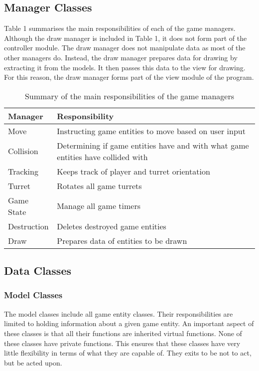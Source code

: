 \documentclass[10pt,twocolumn]{witseiepaper}
\begin{document}
\subsection{Manager Classes}
Table 1 summarises the main responsibilities of each of the game managers. Although the draw manager is included in Table 1, it does not form part of the controller module. The draw manager does not manipulate data as most of the other managers do. Instead, the draw manager prepares data for drawing by extracting it from the models. It then passes this data to the view for drawing. For this reason, the draw manager forms part of the view module of the program. 

\begin{table}[h]
	\centering
	\caption{Summary of the main responsibilities of the game managers}
	\begin{tabular}{|>{\centering\arraybackslash}m{2cm}|>{\centering\arraybackslash}m{4.5cm}|}
		\hline 
		\textbf{Manager} & \textbf{Responsibility} \\ 
		\hline 
		Move & Instructing game entities to move based on user input \\ 
		\hline 
		Collision & Determining if game entities have and with what game 								entities have collided with \\ 
		\hline 
		Tracking & Keeps track of player and turret orientation \\ 
		\hline 
		Turret & Rotates all game turrets \\ 
		\hline 
		Game State & Manage all game timers \\ 
		\hline 
		Destruction & Deletes destroyed game entities \\ 
		\hline 
		Draw & Prepares data of entities to be drawn \\ 
		\hline 
	\end{tabular} 
\end{table}

\subsection{Data Classes}
\subsubsection{Model Classes} The model classes include all game entity classes. Their responsibilities are limited to holding information about a given game entity. An important aspect of these classes is that all their functions are inherited virtual functions. None of these classes have private functions. This ensures that these classes have very little flexibility in terms of what they are capable of. They exits to be not to act, but be acted upon.
\end{document}
